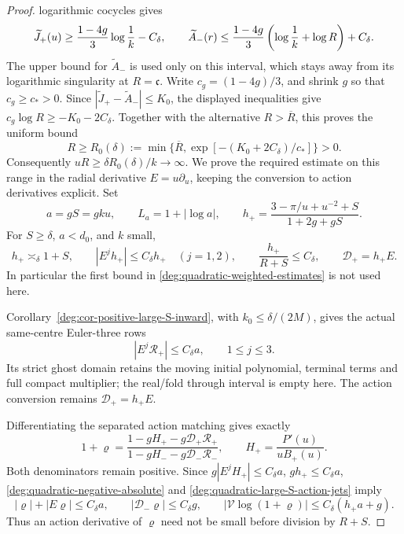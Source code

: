 \begin{proof}
logarithmic cocycles gives
\begin{equation}
 \widetilde J_+(u)\ge {1-4g\over3}\log{1\over k}-C_\delta,
 \qquad
 \widetilde A_-(r)\le {1-4g\over3}
   \left(\log{1\over k}+\log R\right)+C_\delta.
 \label{deg:quadratic-large-S-action}
\end{equation}
The upper bound for \(\widetilde A_-\) is used only on this interval,
which stays away from its logarithmic singularity at
\(R=\mathfrak c\).  Write \(c_g=(1-4g)/3\), and shrink \(g\) so
that \(c_g\ge c_*>0\).  Since
\(|\widetilde J_+-\widetilde A_-|\le K_0\), the displayed inequalities
give \(c_g\log R\ge-K_0-2C_\delta\).  Together with the alternative
\(R>\overline R\), this proves the uniform bound
\[
 R\ge R_0(\delta):=
 \min\{\overline R,\exp[-(K_0+2C_\delta)/c_*]\}>0.
\]
Consequently \(uR\ge\delta R_0(\delta)/k\to\infty\).
We prove the required estimate on this range in the radial derivative
\(E=u\partial_u\), keeping the conversion to action derivatives
explicit.  Set
\[
 a=gS=gku,\qquad L_a=1+|\log a|,\qquad
 h_+=\frac{3-\pi/u+u^{-2}+S}{1+2g+gS}.
\]
For \(S\ge\delta\), \(a<d_0\), and \(k\) small,
\begin{equation}
 h_+\asymp_\delta1+S,\qquad
 |E^jh_+|\le C_\delta h_+\quad(j=1,2),\qquad
 \frac{h_+}{R+S}\le C_\delta,
 \qquad \mathcal D_+=h_+E.
 \label{deg:quadratic-large-S-speed}
\end{equation}
In particular the first bound in
\eqref{deg:quadratic-weighted-estimates} is not used here.

Corollary~\ref{deg:cor-positive-large-S-inward}, with
\(k_0\le\delta/(2M)\), gives the actual same-centre Euler-three rows
\begin{equation}\label{deg:quadratic-large-S-action-jets}
 |E^j\mathcal R_+|\le C_\delta a,\qquad1\le j\le3.
\end{equation}
Its strict ghost domain retains the moving initial polynomial,
terminal terms and full compact multiplier; the real/fold through
interval is empty here. The action conversion remains \(\mathcal D_+=h_+E\).

Differentiating the separated action matching gives exactly
\[
 1+\varrho=
 \frac{1-gH_+-g\mathcal D_+\mathcal R_+}
      {1-gH_--g\mathcal D_-\mathcal R_-},\qquad
 H_+=\frac{P'(u)}{uB_+(u)}.
\]
Both denominators remain positive.  Since
\(g|E^jH_+|\le C_\delta a\), \(gh_+\le C_\delta a\),
\eqref{deg:quadratic-negative-absolute} and
\eqref{deg:quadratic-large-S-action-jets} imply
\begin{equation}
 |\varrho|+|E\varrho|\le C_\delta a,\qquad
 |\mathcal D_-\varrho|\le C_\delta g,\qquad
 |\mathcal V\log(1+\varrho)|
       \le C_\delta(h_+a+g).
 \label{deg:quadratic-large-S-relative}
\end{equation}
Thus an action derivative of \(\varrho\) need not be small before
division by \(R+S\).


\end{proof}
